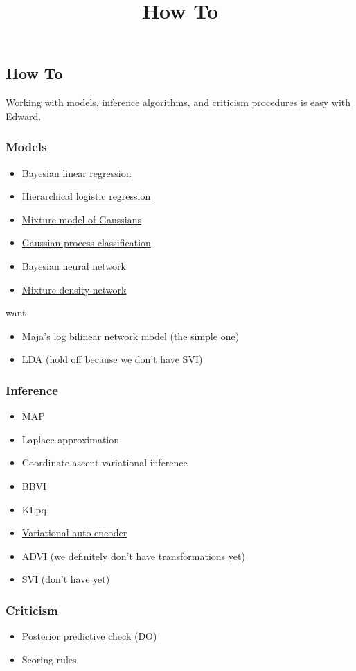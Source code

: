 \title{How To}

\subsection{How To}
Working with models, inference algorithms, and criticism procedures is easy with
Edward.

\subsubsection{Models}

\begin{itemize}
\item
  \href{https://github.com/blei-lab/edward/blob/master/examples/bayesian_linear_regression.py}{Bayesian
  linear regression}
\item
  \href{https://github.com/blei-lab/edward/blob/master/examples/hierarchical_logistic_regression.py}{Hierarchical
  logistic regression}
\item
  \href{https://github.com/blei-lab/edward/blob/master/examples/mixture_gaussian.py}{Mixture
  model of Gaussians}
\item
  \href{https://github.com/blei-lab/edward/blob/master/examples/gp_classification.py}{Gaussian
  process classification}
\item
  \href{https://github.com/blei-lab/edward/blob/master/examples/bayesian_nn.py}{Bayesian
  neural network}
\item
  \href{https://github.com/blei-lab/edward/blob/master/examples/mixture_density_network.py}{Mixture
  density network}
\end{itemize}

want

\begin{itemize}
  \item Maja's log bilinear network model (the simple one)
  \item LDA (hold off because we don't have SVI)
\end{itemize}

\subsubsection{Inference}

\begin{itemize}
  \item MAP
  \item Laplace approximation
  \item Coordinate ascent variational inference
  \item BBVI
  \item KLpq
  \item
  \href{https://github.com/blei-lab/edward/blob/master/examples/convolutional_vae.py}{Variational
  auto-encoder}
  \item ADVI (we definitely don't have transformations yet)
  \item SVI (don't have yet)
\end{itemize}

\subsubsection{Criticism}

\begin{itemize}
  \item Posterior predictive check (DO)
  \item Scoring rules
\end{itemize}
